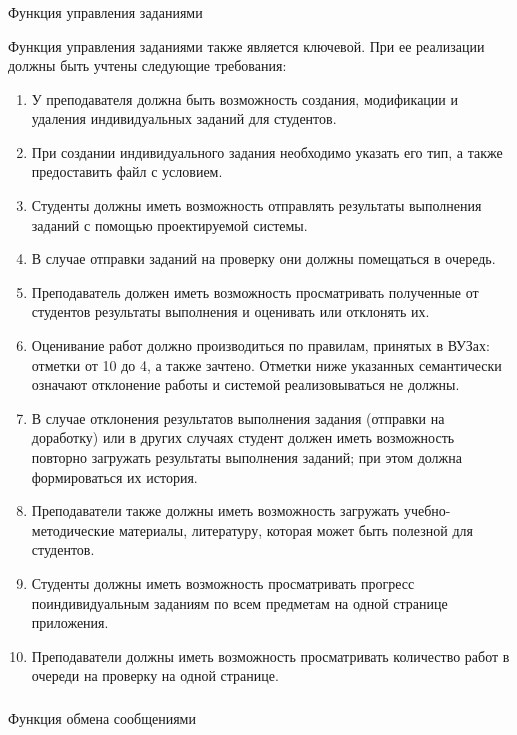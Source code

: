 \subsubsection{} Функция управления заданиями
\label{sec:domain:specification:tasks}

Функция управления заданиями также является ключевой. При ее реализации должны быть учтены следующие требования:

\begin{enumerate}
	\item У преподавателя должна быть возможность создания, модификации и удаления индивидуальных заданий для студентов.
	\item При создании индивидуального задания необходимо указать его тип, а также предоставить файл с условием.
	\item Студенты должны иметь возможность отправлять результаты выполнения заданий с помощью проектируемой системы.
	\item В случае отправки заданий на проверку они должны помещаться в очередь.
	\item Преподаватель должен иметь возможность просматривать полученные от студентов результаты выполнения и оценивать или отклонять их.
	\item Оценивание работ должно производиться по правилам, принятых в ВУЗах: отметки от 10 до 4, а также зачтено. Отметки ниже указанных семантически означают отклонение работы и системой реализовываться не должны.
	\item В случае отклонения результатов выполнения задания (отправки на доработку) или в других случаях студент должен иметь возможность повторно загружать результаты выполнения заданий; при этом должна формироваться их история.
	\item Преподаватели также должны иметь возможность загружать учебно-методические материалы, литературу, которая может быть полезной для студентов.
	\item Студенты должны иметь возможность просматривать прогресс по индивидуальным заданиям по всем предметам на одной странице приложения.
	\item Преподаватели должны иметь возможность просматривать количество работ в очереди на проверку на одной странице.
\end{enumerate}

\subsubsection{} Функция обмена сообщениями
\label{sec:domain:specification:messages}


